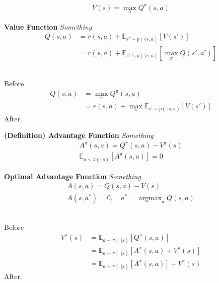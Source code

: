 \begin{align*}
    V(s) = \max_{a}Q^{\pi}(s,a)
\end{align*}




\begin{tcolorbox}
\textbf{
    Value Function
} 
\textit{
    Something
}
\begin{align*}
    Q(s,a) & = r(s,a) + \mathbb{E}_{s' \sim p(\cdot|s,a)}[V(s')] \\
    & = r(s,a) + \mathbb{E}_{s' \sim p(\cdot|s,a)}[\max_{a'}Q(s',a')]
\end{align*}
\end{tcolorbox}

\begin{solution}\ \\
Before
\begin{align*}
    Q(s,a) & = \max_{\pi}Q^{\pi}(s,a) \\
    & = r(s,a) + \max_{\pi}\mathbb{E}_{s' \sim p(\cdot|s,a)}[V(s')]
\end{align*}
After.
\end{solution}





\begin{tcolorbox}
\textbf{
    (Definition) Advantage Function
} 
\textit{
    Something
}
\begin{align*}
    A^{\pi}(s,a) = Q^{\pi}(s,a) - V^{\pi}(s) \\
    \mathbb{E}_{a \sim \pi(\cdot|s)}[A^{\pi}(s,a)] = 0
\end{align*}
\end{tcolorbox}





\begin{tcolorbox}
\textbf{
    Optimal Advantage Function
} 
\textit{
    Something
}
\begin{align*}
    A(s,a) = Q(s,a) - V(s) \\
    A(s,a^{*}) = 0, \quad a^{*} = \mathop{\arg\max}_{a}Q(s,a)
\end{align*}
\end{tcolorbox}

\begin{solution}\ \\
Before
\begin{align*}
    V^{\pi}(s) & = \mathbb{E}_{a \sim \pi(\cdot|s)}[Q^{\pi}(s,a)] \\
    & = \mathbb{E}_{a \sim \pi(\cdot|s)}[A^{\pi}(s,a) + V^{\pi}(s)] \\
    & = \mathbb{E}_{a \sim \pi(\cdot|s)}[A^{\pi}(s,a)] + V^{\pi}(s)
\end{align*}
After.
\end{solution}











